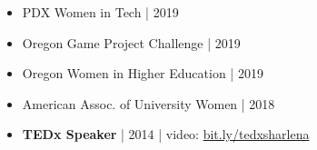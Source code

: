 \begin{itemize}
    \item{PDX Women in Tech | 2019}
    \item{Oregon Game Project Challenge | 2019}
    \item{Oregon Women in Higher Education | 2019}
    \item{American Assoc. of University Women | 2018}
    \item{ \textbf{TEDx Speaker} | 2014 | video: {\href{https://www.youtube.com/watch?v=wex-7n593cI}{bit.ly/tedxsharlena}}}
\end{itemize}
\smallskip